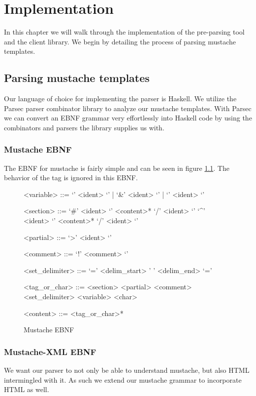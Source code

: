 \documentclass[thesis.tex]{subfiles}
\begin{document}
\chapter{Implementation}
\label{chap:implementation}

In this chapter we will walk through the implementation of the pre-parsing tool
and the client library. We begin by detailing the process of parsing
mustache templates.

\section{Parsing mustache templates}
Our language of choice for implementing the parser is Haskell.
We utilize the Parsec parser combinator library to analyze our mustache
templates. With Parsec we can convert an EBNF grammar very effortlessly
into Haskell code by using the combinators and parsers the library supplies
us with.

\subsection{Mustache EBNF}
The EBNF for mustache is fairly simple and can be seen in figure
\ref{fig:mustache.ebnf}.
The behavior of the  tag is ignored in this EBNF.

\begin{figure}
	\centering
	\setlength{\grammarindent}{3.5cm}
	\begin{grammar}
<variable> ::= `{{{' <ident> `}}}' | `{{&' <ident> `}}' | `{{' <ident> `}}'

<section> ::= `{{#' <ident> `}}' <content>* `{{/' <ident> `}}'
         \alt `{{^' <ident> `}}' <content>* `{{/' <ident> `}}'

<partial> ::= `{{>' <ident> `}}'

<comment> ::= `{{!' <comment> `}}'

<set\_delimiter> ::= `{{=' <delim\_start>  ' ' <delim\_end> `=}}'

<tag\_or\_char> ::= <section>
               \alt <partial>
               \alt <comment>
               \alt <set\_delimiter>
               \alt <variable>
               \alt <char>

<content> ::= <tag\_or\_char>*
	\end{grammar}
	\caption{Mustache EBNF}
	\label{fig:mustache.ebnf}
\end{figure}

\subsection{Mustache-XML EBNF}
\label{sec:mustache-xml-ebnf}
We want our parser to not only be able to understand mustache, but also HTML
intermingled with it. As such we extend our mustache grammar to incorporate
HTML as well.
\end{document}
